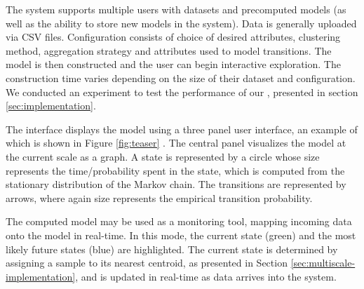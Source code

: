 
\iffalse
Features  
\begin{itemize}
	\item Qualitative representation - states and transitions
	\item State identification services:
	\begin{itemize}
		\item State details and attribute highlighting - histograms + attribute colors
		\item \lstopar{Timeline + parallel coordinates \cite{parcoords} - when do states occur in time}
		\item \lstopar{Coloring states based on attributes}
		\item Decision trees + rule extraction - Explanation of states
		\item Automatic name generation
		\item Zooming into a state + showing paths from a state
	\end{itemize}
\end{itemize}
\fi

The system supports multiple users with datasets and precomputed models (as well as the ability to store new models in the system). Data is generally uploaded via CSV files.  Configuration consists of choice of desired attributes,  clustering method, aggregation strategy and attributes used to model transitions. The model is then constructed and the user can begin interactive exploration. The construction time varies depending on the size of 
their dataset and configuration. We conducted an experiment to test the performance of our ,
presented in section \ref{sec:implementation}.

The interface displays the model using a three panel user interface, an example of
which is shown in Figure \ref{fig:teaser} . The central panel visualizes the model at the current scale as a graph. A state is represented by a circle  whose size represents the time/probability spent in the state, which is computed from the stationary distribution of the Markov chain. The transitions are represented by arrows, where again size represents the empirical transition probability. 

The computed model may be used as a monitoring tool, mapping incoming data onto the model in real-time. 
In this mode, the current state (green) and the most likely future states (blue)
are highlighted. The current state is determined by assigning a sample to its nearest 
centroid, as presented in Section \ref{sec:multiscale-implementation}, and is updated in real-time as
data arrives into the system.

